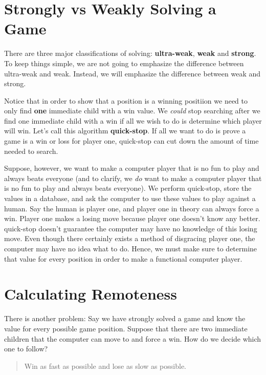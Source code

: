 \documentclass[a4paper]{article}
\begin{document}
\section{ Strongly vs Weakly Solving a Game }

There are three major classifications of solving: \textbf{ultra-weak}, \textbf{weak} and \textbf{strong}. To keep things simple, we are not going to emphasize the difference between ultra-weak and weak. Instead, we will emphasize the difference between weak and strong.

Notice that in order to show that a position is a winning positiion we need to only find \textbf{one} immediate child with a win value. We \textit{could} stop searching after we find one immediate child with a win if all we wish to do is determine which player will win. Let's call this algorithm \textbf{quick-stop}. If all we want to do is prove a game is a win or loss for player one, quick-stop can cut down the amount of time needed to search.

Suppose, however, we want to make a computer player that is no fun to play and always beats everyone (and to clarify, we \textit{do} want to make a computer player that is no fun to play and always beats everyone). We perform quick-stop, store the values in a database, and ask the computer to use these values to play against a human. Say the human is player one, and player one in theory can always force a win. Player one makes a losing move because player one doesn't know any better. quick-stop doesn't guarantee the computer may have no knowledge of this losing move. Even though there certainly exists a method of disgracing player one, the computer may have no idea what to do. Hence, we must make sure to determine that value for every position in order to make a functional computer player.

\section{ Calculating Remoteness }

There is another problem: Say we have strongly solved a game and know the value for every possible game position. Suppose that there are two immediate children that the computer can move to and force a win. How do we decide which one to follow?

\begin{quote}
    Win as fast as possible and lose as slow as possible.
\end{quote}
\end{document}
